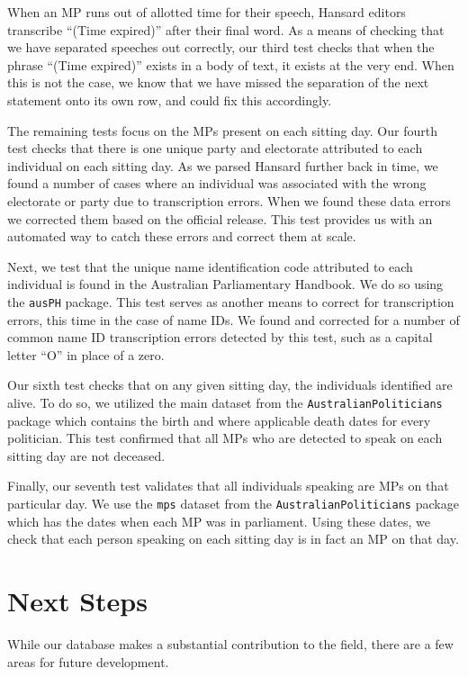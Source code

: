 \documentclass[
  letterpaper,
  DIV=11,
  numbers=noendperiod]{scrartcl}
\begin{document}
When an MP runs out of allotted time for their speech, Hansard editors
transcribe ``(Time expired)'' after their final word. As a means of
checking that we have separated speeches out correctly, our third test
checks that when the phrase ``(Time expired)'' exists in a body of text,
it exists at the very end. When this is not the case, we know that we
have missed the separation of the next statement onto its own row, and
could fix this accordingly.

The remaining tests focus on the MPs present on each sitting day. Our
fourth test checks that there is one unique party and electorate
attributed to each individual on each sitting day. As we parsed Hansard
further back in time, we found a number of cases where an individual was
associated with the wrong electorate or party due to transcription
errors. When we found these data errors we corrected them based on the
official release. This test provides us with an automated way to catch
these errors and correct them at scale.

Next, we test that the unique name identification code attributed to
each individual is found in the Australian Parliamentary Handbook. We do
so using the \texttt{ausPH} package. This test serves as another means
to correct for transcription errors, this time in the case of name IDs.
We found and corrected for a number of common name ID transcription
errors detected by this test, such as a capital letter ``O'' in place of
a zero.

Our sixth test checks that on any given sitting day, the individuals
identified are alive. To do so, we utilized the main dataset from the
\texttt{AustralianPoliticians} package which contains the birth and
where applicable death dates for every politician. This test confirmed
that all MPs who are detected to speak on each sitting day are not
deceased.

Finally, our seventh test validates that all individuals speaking are
MPs on that particular day. We use the \texttt{mps} dataset from the
\texttt{AustralianPoliticians} package which has the dates when each MP
was in parliament. Using these dates, we check that each person speaking
on each sitting day is in fact an MP on that day.

\hypertarget{next-steps}{%
\section{Next Steps}\label{next-steps}}

While our database makes a substantial contribution to the field, there
are a few areas for future development.
\end{document}
